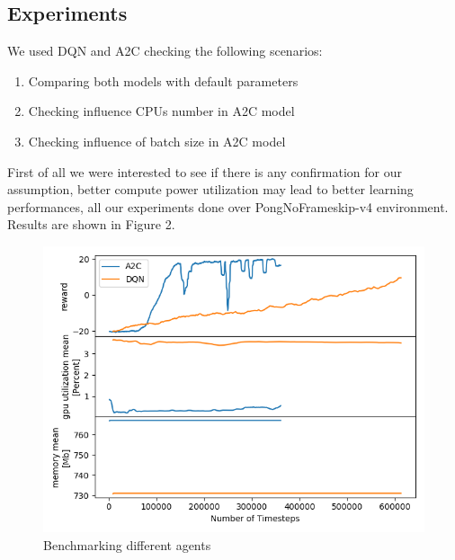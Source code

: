 \documentclass[11 pt, twocolumn]{article}
\begin{document}
\subsection{Experiments}
We used DQN and A2C checking the following scenarios:
\begin{enumerate}
\item Comparing both models with default parameters
\item Checking influence CPUs number in A2C model
\item Checking influence of batch size in A2C model
\end{enumerate}
First of all we were interested to see if there is any confirmation for our assumption, better compute power utilization may lead to better learning performances, all our experiments done over PongNoFrameskip-v4 environment. Results are shown in Figure 2.
\begin{figure}
\centering
\includegraphics[width=0.93\columnwidth]{2c_32b.png}
\caption{Benchmarking different agents}
\vspace*{2pt}
\end{figure}
\end{document}

